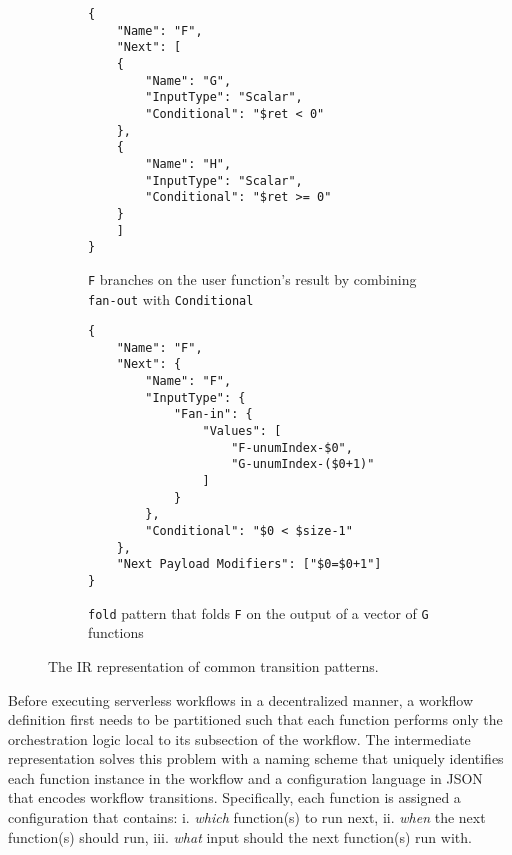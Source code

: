 \begin{figure*}[t!]
	\begin{subfigure}[t]{\columnwidth}
		\centering
		\begin{verbatim}
{
	"Name": "F",
	"Next": [
	{
		"Name": "G",
		"InputType": "Scalar",
		"Conditional": "$ret < 0"
	},
	{
		"Name": "H",
		"InputType": "Scalar",
		"Conditional": "$ret >= 0"
	}
	]
}
		\end{verbatim}
		\caption{\texttt{F} branches on the user function's result by
		combining \texttt{fan-out} with \texttt{Conditional}}
		\label{fig:gadget-examples-branch}
	\end{subfigure}

	\begin{subfigure}[t]{\columnwidth}
		\centering
		\begin{verbatim}
{
    "Name": "F",
    "Next": {
        "Name": "F",
        "InputType": {
            "Fan-in": {
                "Values": [
                    "F-unumIndex-$0",
                    "G-unumIndex-($0+1)"
                ]
            }
        },
        "Conditional": "$0 < $size-1"
    },
    "Next Payload Modifiers": ["$0=$0+1"]
}
		\end{verbatim}
		\caption{\texttt{fold} pattern that folds \texttt{F} on the output of
		a vector of \texttt{G} functions}
		\label{fig:gadget-examples-fold}
	\end{subfigure}

	\caption{The \name{} IR representation of common transition patterns.}
	\label{fig:ir-examples}
\end{figure*}
 

Before executing serverless workflows in a decentralized manner, a workflow
definition first needs to be partitioned such that each function performs only
the orchestration logic local to its subsection of the workflow. The \name{}
intermediate representation solves this problem with a naming scheme that
uniquely identifies each function instance in the workflow and a configuration
language in JSON that encodes workflow transitions. Specifically, each
function is assigned a configuration that contains: i. \textit{which}
function(s) to run next, ii. \textit{when} the next function(s) should run,
iii. \textit{what} input should the next function(s) run with.

